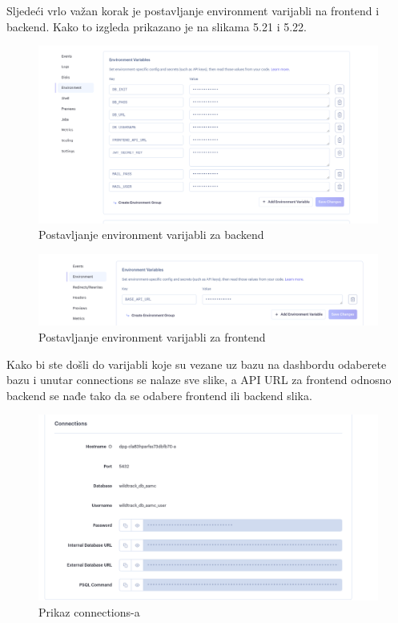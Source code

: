 			\vspace{72pt}
			Sljedeći vrlo važan korak je postavljanje environment varijabli na frontend i backend. Kako to izgleda prikazano je na slikama 5.21 i 5.22.
			
			\begin{figure}[H]
				\centering
				\includegraphics[width=\textwidth]{slike/slika7.PNG}
				\caption{Postavljanje environment varijabli za backend}
				\label{fig:dijagram_baze}
			\end{figure}
			
			\begin{figure}[H]
				\centering
				\includegraphics[width=\textwidth]{slike/slika8.PNG}
				\caption{Postavljanje environment varijabli za frontend}
				\label{fig:dijagram_baze}
			\end{figure}
			
			
			Kako bi ste došli do varijabli koje su vezane uz bazu na dashbordu odaberete bazu i unutar connections se nalaze sve slike, a API URL za frontend odnosno backend se nađe tako da se odabere frontend ili backend slika.
			
			\begin{figure}[H]
				\centering
				\includegraphics[width=\textwidth]{slike/slika9.PNG}
				\caption{Prikaz connections-a}
				\label{fig:dijagram_baze}
			\end{figure}
			
